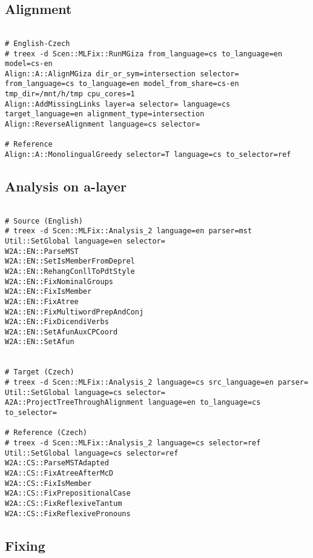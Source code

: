\subsection{Alignment}

\begin{lstlisting}

# English-Czech
# treex -d Scen::MLFix::RunMGiza from_language=cs to_language=en model=cs-en
Align::A::AlignMGiza dir_or_sym=intersection selector= from_language=cs to_language=en model_from_share=cs-en tmp_dir=/mnt/h/tmp cpu_cores=1
Align::AddMissingLinks layer=a selector= language=cs target_language=en alignment_type=intersection
Align::ReverseAlignment language=cs selector=

# Reference
Align::A::MonolingualGreedy selector=T language=cs to_selector=ref

\end{lstlisting}

\subsection{Analysis on a-layer}

\begin{lstlisting}

# Source (English)
# treex -d Scen::MLFix::Analysis_2 language=en parser=mst
Util::SetGlobal language=en selector=
W2A::EN::ParseMST
W2A::EN::SetIsMemberFromDeprel
W2A::EN::RehangConllToPdtStyle
W2A::EN::FixNominalGroups
W2A::EN::FixIsMember
W2A::EN::FixAtree
W2A::EN::FixMultiwordPrepAndConj
W2A::EN::FixDicendiVerbs
W2A::EN::SetAfunAuxCPCoord
W2A::EN::SetAfun


# Target (Czech)
# treex -d Scen::MLFix::Analysis_2 language=cs src_language=en parser=
Util::SetGlobal language=cs selector=
A2A::ProjectTreeThroughAlignment language=en to_language=cs to_selector=

# Reference (Czech)
# treex -d Scen::MLFix::Analysis_2 language=cs selector=ref
Util::SetGlobal language=cs selector=ref
W2A::CS::ParseMSTAdapted
W2A::CS::FixAtreeAfterMcD
W2A::CS::FixIsMember
W2A::CS::FixPrepositionalCase
W2A::CS::FixReflexiveTantum
W2A::CS::FixReflexivePronouns

\end{lstlisting}

\subsection{Fixing}

